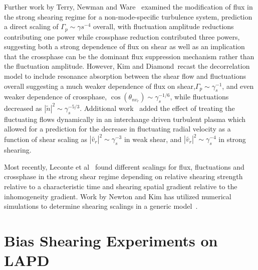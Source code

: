 \documentclass[aip,pop,amsmath,amssymb,reprint,superscriptaddress]{revtex4-1} %
\begin{document}
Further work by Terry, Newman and Ware~\cite{terry01} examined the modification of flux in the strong shearing regime for a non-mode-specific turbulence system, prediction a direct scaling of $\Gamma_{p} \sim \gamma{s}^{-4}$ overall, with fluctuation amplitude reductions contributing one power while crossphase reduction contributed three powers, suggesting both a strong dependence of flux on shear as well as an implication that the crossphase can be the dominant flux suppression mechanism rather than the fluctuation amplitude. However, Kim and Diamond~\cite{kim03}recast the decorrelation model to include resonance absorption between the shear flow and fluctuations overall suggesting a much weaker dependence of flux on shear,$\Gamma_{p} \sim \gamma_{s}^{-1}$, and even weaker dependence of crossphase, $\cos(\theta_{nv_{r}}) \sim \gamma_{s}^{-1/6}$, while fluctuations decreased as $|\tilde{n}|^{2} \sim \gamma_{s}^{-5/3}$. Additional work~\cite{kim04} added the effect of treating the fluctuating flows dynamically in an interchange driven turbulent plasma which allowed for a prediction for the decrease in fluctuating radial velocity as a function of shear scaling as $|\tilde{v_{r}}|^{2} \sim \gamma_{s}^{-3}$ in weak shear, and $|\tilde{v_{r}}|^{2} \sim \gamma_{s}^{-4}$ in strong shearing.

Most recently, Leconte et al~\cite{leconte06} found different scalings for flux, fluctuations and crossphase in the strong shear regime depending on relative shearing strength relative to a characteristic time and shearing spatial gradient relative to the inhomogeneity gradient. Work by Newton and Kim has utilized numerical simulations to determine shearing scalings in a generic model~\cite{newton07,newton11}.

\section{Bias Shearing Experiments on LAPD}
\end{document}
